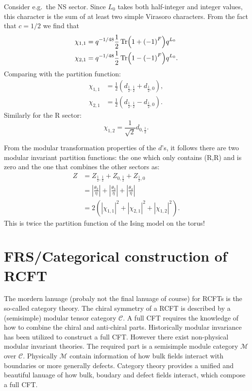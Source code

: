 \documentclass[submission, PhysLectNotes]{SciPost}
\begin{document}
Consider e.g.\ the NS sector. Since $L_0$ takes both half-integer and integer values, this character is the sum of at least two simple Virasoro characters. From the fact that $c=1/2$ we find that
\begin{align}
	\chi_{1,1} &= q^{-1/48}\frac{1}{2}\Tr(1+{(-1)}^F)q^{L_0}\\
	\chi_{2,1} &= q^{-1/48}\frac{1}{2}\Tr(1-{(-1)}^F)q^{L_0}.
\end{align}
Comparing with the partition function:
\begin{align}
	\chi_{1,1} &= \frac{1}{2}\left(d_{\frac{1}{2},\frac{1}{2}} + d_{\frac{1}{2},0}\right),\\
	\chi_{2,1} &= \frac{1}{2}\left(d_{\frac{1}{2},\frac{1}{2}} - d_{\frac{1}{2},0}\right).
\end{align}
Similarly for the R sector:
\begin{equation}
	\chi_{1,2} = \frac{1}{\sqrt{2}}d_{0,\frac{1}{2}}.
\end{equation}

From the modular transformation properties of the $d$'s, it follows there are two modular invariant partition functions: the one which only contains (R,R) and is zero and the one that combines the other sectors as:
\begin{align}
	Z &= Z_{\frac{1}{2},\frac{1}{2}} + Z_{0,\frac{1}{2}} + Z_{\frac{1}{2},0}\\
	&= \left|\frac{\theta_2}{\eta}\right| + \left|\frac{\theta_3}{\eta}\right| + \left|\frac{\theta_4}{\eta}\right|\\
	&= 2\left(|\chi_{1,1}|^2 + |\chi_{2,1}|^2 + |\chi_{1,2}|^2\right).
\end{align}
This is twice the partition function of the Ising model on the torus!



\section{FRS/Categorical construction of RCFT}
The mordern lanuage (probaly not the final lanuage of course) for RCFTs is the so-called category theory. The chiral symmetry of a RCFT is described by a (semisimple) modular tensor category $\mathcal{C}$. A full CFT requires the knowledge of how to combine the chiral and anti-chiral parts. Historically modular invariance has been utilized to construct a full CFT\@. However there exist non-physical modular invariant theories. The required part is a semisimple module category $\mathcal{M}$ over $\mathcal{C}$. Physically $\mathcal{M}$ contain information of how bulk fields interact with boundaries or more generally defects. Category theory provides a unified and beautiful lanuage of how bulk, boudary and defect fields interact, which compose a full CFT\@. 
\end{document}
